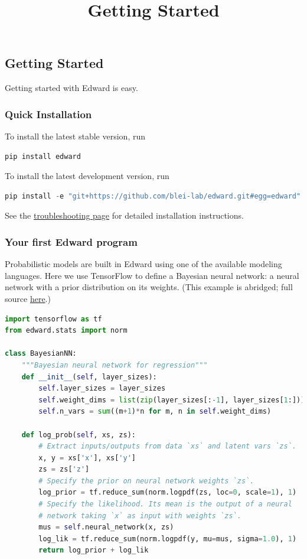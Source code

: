\title{Getting Started}

\subsection{Getting Started}
Getting started with Edward is easy.

\subsubsection{Quick Installation}
To install the latest stable version, run

\begin{lstlisting}[language=Java]
pip install edward
\end{lstlisting}

To install the latest development version, run

\begin{lstlisting}[language=Java]
pip install -e "git+https://github.com/blei-lab/edward.git#egg=edward"
\end{lstlisting}

See the \href{troubleshooting}{troubleshooting page} for detailed
installation instructions.


\subsubsection{Your first Edward program}

Probabilistic models are built in Edward using one of the available
modeling languages. Here we use TensorFlow to define a Bayesian neural
network: a neural network with a prior distribution on its weights.
(This example is abridged; full source
\href{https://github.com/blei-lab/edward/blob/master/examples/getting_started_example.py}
{here}.)
\begin{lstlisting}[language=Python]
import tensorflow as tf
from edward.stats import norm

class BayesianNN:
    """Bayesian neural network for regression"""
    def __init__(self, layer_sizes):
        self.layer_sizes = layer_sizes
        self.weight_dims = list(zip(layer_sizes[:-1], layer_sizes[1:]))
        self.n_vars = sum((m+1)*n for m, n in self.weight_dims)

    def log_prob(self, xs, zs):
        # Extract inputs/outputs from data `xs` and latent vars `zs`.
        x, y = xs['x'], xs['y']
        zs = zs['z']
        # Specify the prior on neural network weights `zs`.
        log_prior = tf.reduce_sum(norm.logpdf(zs, loc=0, scale=1), 1)
        # Specify the likelihood. Its mean is the output of a neural
        # network taking `x` as input with weights `zs`.
        mus = self.neural_network(x, zs)
        log_lik = tf.reduce_sum(norm.logpdf(y, mu=mus, sigma=1.0), 1)
        return log_prior + log_lik
\end{lstlisting}


